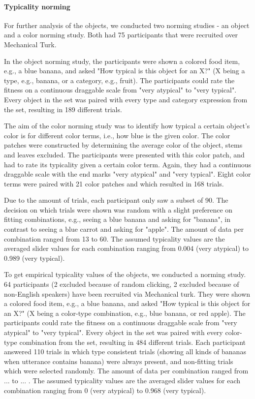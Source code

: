 \documentclass[10pt,letterpaper]{article}
\begin{document}
\paragraph{Typicality norming}
For further analysis of the objects, we conducted two norming studies - an object and a color norming study. Both had 75 participants that were recruited over Mechanical Turk.

In the object norming study, the participants were shown a colored food item, e.g., a blue banana, and asked "How typical is this object for an X?" (X being a type, e.g., banana, or a category, e.g., fruit). The participants could rate the fitness on a continuous draggable scale from "very atypical" to "very typical". Every object in the set was paired with every type and category expression from the set, resulting in 189 different trials.

The aim of the color norming study was to identify how typical a certain object's color is for different color terms, i.e., how blue is the given color. The color patches were constructed by determining the average color of the object, stems and leaves excluded. The participants were presented with this color patch, and had to rate its typicality given a certain color term. Again, they had a continuous draggable scale with the end marks "very atypical" and "very typical". Eight color terms were paired with 21 color patches and which resulted in 168 trials.

Due to the amount of trials, each participant only saw a subset of 90. The decision on which trials were shown was random with a slight preference on fitting combinations, e.g., seeing a blue banana and asking for "banana", in contrast to seeing a blue carrot and asking for "apple". The amount of data per combination ranged from 13 to 60. The assumed typicality values are the averaged slider values for each combination ranging from 0.004 (very atypical) to 0.989 (very typical). 

To get empirical typicality values of the objects, we conducted a norming study. 64 participants (2 excluded because of random clicking, 2 excluded because of non-English speakers) have been recruited via Mechanical turk. 
They were shown a colored food item, e.g., a blue banana, and asked "How typical is this object for an X?" (X being a color-type combination, e.g., blue banana, or red apple). The participants could rate the fitness on a continuous draggable scale from "very atypical" to "very typical". Every object in the set was paired with every color-type combination from the set, resulting in 484 different trials. Each participant answered 110 trials in which type consistent trials (showing all kinds of bananas when utterance contains banana) were always present, and non-fitting trials which were selected randomly. The amount of data per combination ranged from ... to ... . The assumed typicality values are the averaged slider values for each combination ranging from 0 (very atypical) to 0.968 (very typical). 
\end{document}
